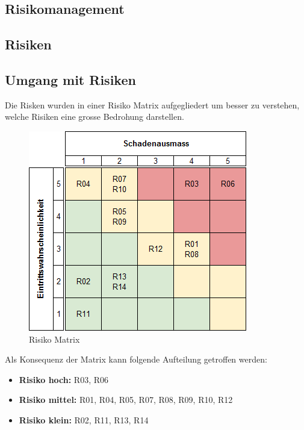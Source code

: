 \newpage


\begin{landscape}
\section{Risikomanagement}
\subsection{Risiken}
\end{landscape}
\subsection{Umgang mit Risiken}
Die Risken wurden in einer Risiko Matrix aufgegliedert um besser zu verstehen, welche Risiken eine grosse Bedrohung darstellen.

\begin{figure}[ht]
	\centering
	\includegraphics[scale=0.7]{images/risk_result.png}
	\caption{Risiko Matrix}
	\label{Risk result}
\end{figure}

Als Konsequenz der Matrix kann folgende Aufteilung getroffen werden:
\begin{itemize}
	\item{\textbf{Risiko hoch:} R03, R06}
	\item{\textbf{Risiko mittel:} R01, R04, R05, R07, R08, R09, R10, R12 }
	\item{\textbf{Risiko klein:} R02, R11, R13, R14}
\end{itemize}
